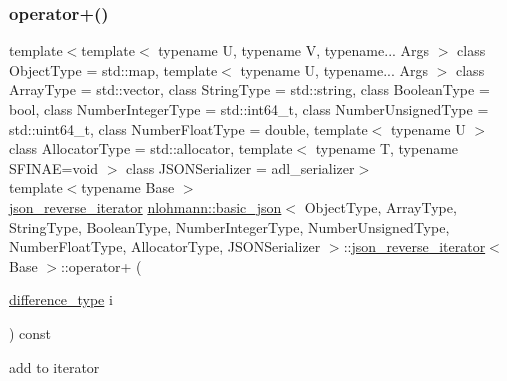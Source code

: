 \subsubsection{\texorpdfstring{operator+()}{operator+()}}
{\footnotesize\ttfamily template$<$template$<$ typename U, typename V, typename... Args $>$ class Object\+Type = std\+::map, template$<$ typename U, typename... Args $>$ class Array\+Type = std\+::vector, class String\+Type  = std\+::string, class Boolean\+Type  = bool, class Number\+Integer\+Type  = std\+::int64\+\_\+t, class Number\+Unsigned\+Type  = std\+::uint64\+\_\+t, class Number\+Float\+Type  = double, template$<$ typename U $>$ class Allocator\+Type = std\+::allocator, template$<$ typename T, typename S\+F\+I\+N\+A\+E=void $>$ class J\+S\+O\+N\+Serializer = adl\+\_\+serializer$>$ \\
template$<$typename Base $>$ \\
\hyperlink{classnlohmann_1_1basic__json_1_1json__reverse__iterator}{json\+\_\+reverse\+\_\+iterator} \hyperlink{classnlohmann_1_1basic__json}{nlohmann\+::basic\+\_\+json}$<$ Object\+Type, Array\+Type, String\+Type, Boolean\+Type, Number\+Integer\+Type, Number\+Unsigned\+Type, Number\+Float\+Type, Allocator\+Type, J\+S\+O\+N\+Serializer $>$\+::\hyperlink{classnlohmann_1_1basic__json_1_1json__reverse__iterator}{json\+\_\+reverse\+\_\+iterator}$<$ Base $>$\+::operator+ (\begin{DoxyParamCaption}\item[{\hyperlink{classnlohmann_1_1basic__json_afe7c1303357e19cea9527af4e9a31d8f}{difference\+\_\+type}}]{i }\end{DoxyParamCaption}) const\hspace{0.3cm}{\ttfamily [inline]}}



add to iterator 

\mbox{\label{classnlohmann_1_1basic__json_1_1json__reverse__iterator_a060bdfaef94d3ca21dd6e7034980ea9c}} 
